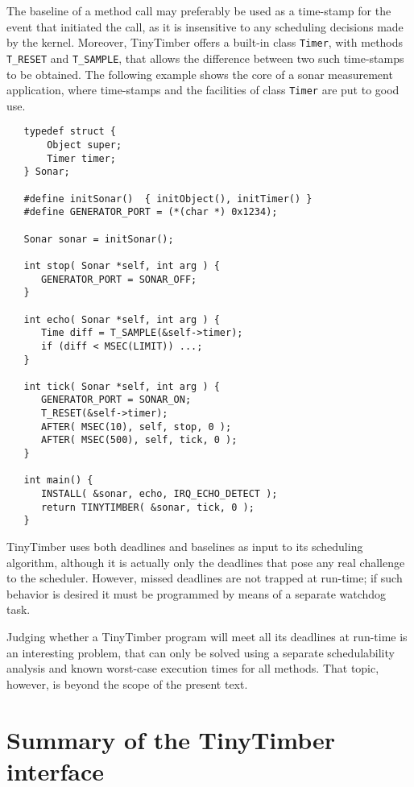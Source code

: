 \documentclass[12pt]{article}
\begin{document}
The baseline of a method call may preferably be used as a time-stamp for the event that initiated the call, as it is insensitive to any scheduling decisions made by the kernel. Moreover, TinyTimber offers a built-in class {\tt Timer}, with methods {\tt T\_RESET} and {\tt T\_SAMPLE}, that allows the difference between two such time-stamps to be obtained. The following example shows the core of a sonar measurement application, where time-stamps and the facilities of class {\tt Timer} are put to good use.
\begin{verbatim}
   typedef struct {
       Object super;
       Timer timer;
   } Sonar;
   
   #define initSonar()  { initObject(), initTimer() }
   #define GENERATOR_PORT = (*(char *) 0x1234);
   
   Sonar sonar = initSonar();
      
   int stop( Sonar *self, int arg ) {
      GENERATOR_PORT = SONAR_OFF;
   }
   
   int echo( Sonar *self, int arg ) {
      Time diff = T_SAMPLE(&self->timer);
      if (diff < MSEC(LIMIT)) ...;
   }
   
   int tick( Sonar *self, int arg ) {
      GENERATOR_PORT = SONAR_ON;
      T_RESET(&self->timer);
      AFTER( MSEC(10), self, stop, 0 );
      AFTER( MSEC(500), self, tick, 0 );
   }
   
   int main() {
      INSTALL( &sonar, echo, IRQ_ECHO_DETECT );
      return TINYTIMBER( &sonar, tick, 0 );
   }
\end{verbatim}

TinyTimber uses both deadlines and baselines as input to its scheduling algorithm, although it is actually only the deadlines that pose any real challenge to the scheduler.  However, missed deadlines are not trapped at run-time; if such behavior is desired it must be programmed by means of a separate watchdog task.

Judging whether a TinyTimber program will meet all its deadlines at run-time is an interesting problem, that can only be solved using a separate schedulability analysis and known worst-case execution times for all methods.  That topic, however, is beyond the scope of the present text.


\section{Summary of the TinyTimber interface}
\end{document}

